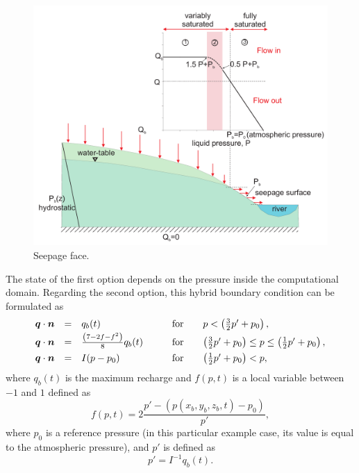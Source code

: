 \begin{figure}  [h]
\begin{center}
\includegraphics[scale=0.3]{figs/seepage_bc.pdf}
\caption{Seepage face.}
\label{fig:seepage_bc}
\end{center}
\end{figure}

The state of the first option depends on the pressure inside the computational domain.
Regarding the second option, this hybrid boundary condition \citep[based on][]{hamm2000} can be formulated as
\begin{equation} \label{eq:fifth_bc_richard}
\begin{array} {lllll}
  {\boldsymbol{q}} \cdot \boldsymbol{n} & = & q_{b}(t) & \qquad \text{for} \quad &  p < \left( \frac{3}{2} p' + p_{0} \right), \\[0.5ex]
  {\boldsymbol{q}} \cdot \boldsymbol{n} & = & \frac{\left(  7-2f-f^{2}  \right)}{8} q_{b}(t) 
                    & \qquad \text{for} \quad &  \left( \frac32 p' + p_{0} \right) \leq p \leq \left( \frac12 p' + p_{0} \right), \\[1.0ex]
  {\boldsymbol{q}} \cdot \boldsymbol{n} & = & I (p - p_{0}) &  \qquad \text{for} \quad & \left( \frac{1}{2} p' + p_{0} \right) < p, 
\end{array} 
\end{equation}
where $q_{b}(t)$ is the maximum recharge and $f(p,t)$ is a local variable between $-1$ and $1$ 
defined as 
\begin{equation}
  f(p,t) = 2 \frac{p'- (p(x_{b},y_{b},z_{b},t) - p_{0}) }{p'},
\end{equation}
where $p_{0}$ is a reference pressure (in this particular example case, its value is equal to 
the atmospheric pressure), and $p'$ is defined as 
\begin{equation}
  p' = I^{-1} q_{b}(t).
\end{equation}








